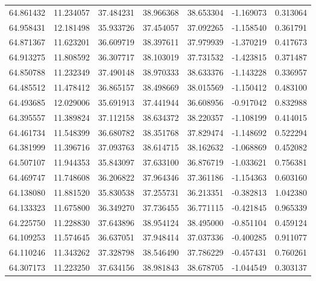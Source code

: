 \begin{tabular}{rrrrrrr}
 64.861432 &  11.234057 &         37.484231 &         38.966368 &         38.653304 & -1.169073 &  0.313064 \\
 64.958431 &  12.181498 &         35.933726 &         37.454057 &         37.092265 & -1.158540 &  0.361791 \\
 64.871367 &  11.623201 &         36.609719 &         38.397611 &         37.979939 & -1.370219 &  0.417673 \\
 64.913275 &  11.808592 &         36.307717 &         38.103019 &         37.731532 & -1.423815 &  0.371487 \\
 64.850788 &  11.232349 &         37.490148 &         38.970333 &         38.633376 & -1.143228 &  0.336957 \\
 64.485512 &  11.478412 &         36.865157 &         38.498669 &         38.015569 & -1.150412 &  0.483100 \\
 64.493685 &  12.029006 &         35.691913 &         37.441944 &         36.608956 & -0.917042 &  0.832988 \\
 64.395557 &  11.389824 &         37.112158 &         38.634372 &         38.220357 & -1.108199 &  0.414015 \\
 64.461734 &  11.548399 &         36.680782 &         38.351768 &         37.829474 & -1.148692 &  0.522294 \\
 64.381999 &  11.396716 &         37.093763 &         38.614715 &         38.162632 & -1.068869 &  0.452082 \\
 64.507107 &  11.944353 &         35.843097 &         37.633100 &         36.876719 & -1.033621 &  0.756381 \\
 64.469747 &  11.748608 &         36.206822 &         37.964346 &         37.361186 & -1.154363 &  0.603160 \\
 64.138080 &  11.881520 &         35.830538 &         37.255731 &         36.213351 & -0.382813 &  1.042380 \\
 64.133323 &  11.675800 &         36.349270 &         37.736455 &         36.771115 & -0.421845 &  0.965339 \\
 64.225750 &  11.228830 &         37.643896 &         38.954124 &         38.495000 & -0.851104 &  0.459124 \\
 64.109253 &  11.574645 &         36.637051 &         37.948414 &         37.037336 & -0.400285 &  0.911077 \\
 64.110246 &  11.343262 &         37.328798 &         38.546490 &         37.786229 & -0.457431 &  0.760261 \\
 64.307173 &  11.223250 &         37.634156 &         38.981843 &         38.678705 & -1.044549 &  0.303137 \\

\end{tabular}
